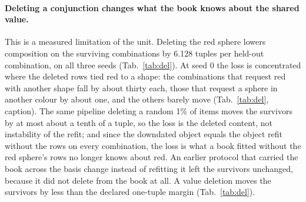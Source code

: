 \documentclass{article} %
\begin{document}
\paragraph{Deleting a conjunction changes what the book knows about the shared value.} This is a
measured limitation of the unit. Deleting the red sphere lowers composition on the surviving combinations
by 6.128 tuples per held-out combination, on all three seeds (Tab.~\ref{tab:del}). At seed 0 the loss is concentrated where %
the deleted rows tied red to a shape: the combinations that request red with another shape fall by %
about thirty each, those that request a sphere in another colour by about one, and the others barely move %
(Tab.~\ref{tab:del}, caption). The same pipeline deleting a random 1\% of items moves the survivors by at most about a tenth of a tuple, %
so the loss is the deleted content, not instability of the refit; and since the %
downdated object equals the object refit without the rows on every combination, the loss is what a book
fitted without the red sphere's rows no longer knows about red. An earlier protocol that carried the
book across the basis change instead of refitting it left the survivors unchanged, because it did
not delete from the book at all. A value deletion moves the survivors %
by less than the declared one-tuple margin (Tab.~\ref{tab:del}). %
\end{document}

